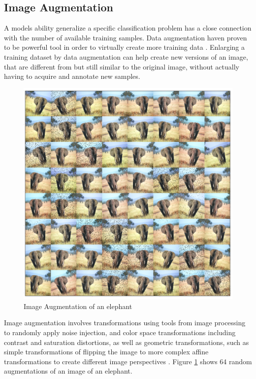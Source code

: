 \subsection{Image Augmentation}

A models ability generalize a specific classification problem has a close connection with the number of available training samples. Data augmentation haven proven to be powerful tool in order to virtually create more training data \cite{perez_effectiveness_2017}. Enlarging a training dataset by data augmentation can help create new versions of an image, that are different from but still similar to the original image, without actually having to acquire and annotate new samples.  

\begin{figure}[H]
	\centering
	\includegraphics[width=\linewidth]{figures/augmentation/augmentation_high_resolution.png}
	\caption[Image Augmentaion Example]{Image Augmentation of an elephant}
	\label{fig:augmentation}
\end{figure}

Image augmentation involves transformations using tools from image processing to randomly apply noise injection, and color space transformations including contrast and saturation distortions, as well as geometric transformations, such as simple transformations of flipping the image to more complex affine transformations to create different image perspectives \cite{shorten_survey_2019}. Figure \ref{fig:augmentation} shows 64 random augmentations of an image of an elephant. 

